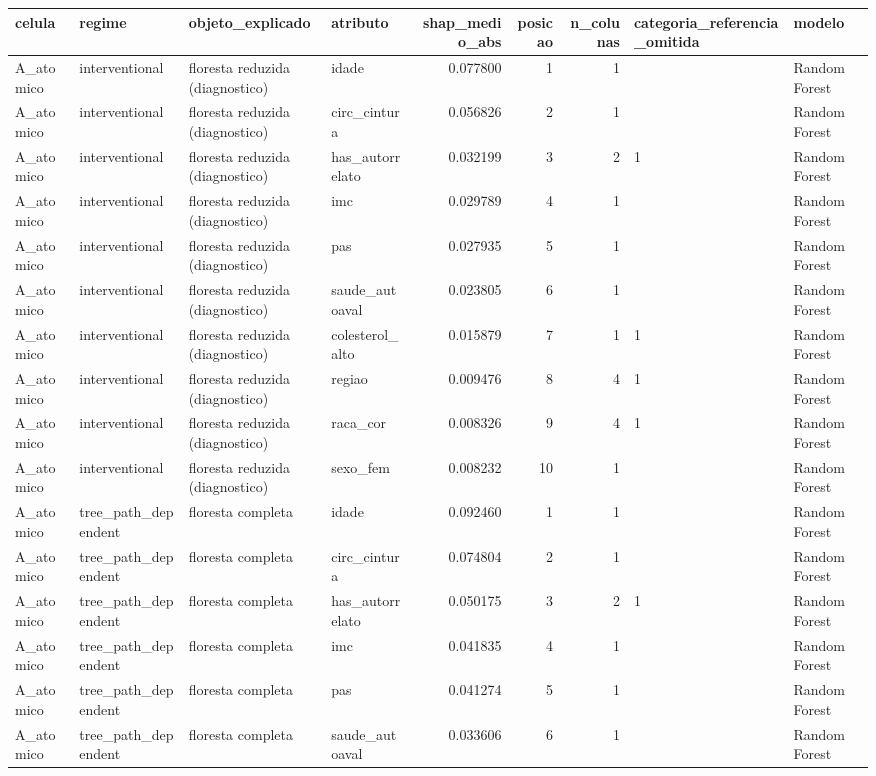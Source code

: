 \begin{tabular}{llllrrrll}
\toprule
celula & regime & objeto_explicado & atributo & shap_medio_abs & posicao & n_colunas & categoria_referencia_omitida & modelo \\
\midrule
A_atomico & interventional & floresta reduzida (diagnostico) & idade & 0.077800 & 1 & 1 &  & Random Forest \\
A_atomico & interventional & floresta reduzida (diagnostico) & circ_cintura & 0.056826 & 2 & 1 &  & Random Forest \\
A_atomico & interventional & floresta reduzida (diagnostico) & has_autorrelato & 0.032199 & 3 & 2 & 1 & Random Forest \\
A_atomico & interventional & floresta reduzida (diagnostico) & imc & 0.029789 & 4 & 1 &  & Random Forest \\
A_atomico & interventional & floresta reduzida (diagnostico) & pas & 0.027935 & 5 & 1 &  & Random Forest \\
A_atomico & interventional & floresta reduzida (diagnostico) & saude_autoaval & 0.023805 & 6 & 1 &  & Random Forest \\
A_atomico & interventional & floresta reduzida (diagnostico) & colesterol_alto & 0.015879 & 7 & 1 & 1 & Random Forest \\
A_atomico & interventional & floresta reduzida (diagnostico) & regiao & 0.009476 & 8 & 4 & 1 & Random Forest \\
A_atomico & interventional & floresta reduzida (diagnostico) & raca_cor & 0.008326 & 9 & 4 & 1 & Random Forest \\
A_atomico & interventional & floresta reduzida (diagnostico) & sexo_fem & 0.008232 & 10 & 1 &  & Random Forest \\
A_atomico & tree_path_dependent & floresta completa & idade & 0.092460 & 1 & 1 &  & Random Forest \\
A_atomico & tree_path_dependent & floresta completa & circ_cintura & 0.074804 & 2 & 1 &  & Random Forest \\
A_atomico & tree_path_dependent & floresta completa & has_autorrelato & 0.050175 & 3 & 2 & 1 & Random Forest \\
A_atomico & tree_path_dependent & floresta completa & imc & 0.041835 & 4 & 1 &  & Random Forest \\
A_atomico & tree_path_dependent & floresta completa & pas & 0.041274 & 5 & 1 &  & Random Forest \\
A_atomico & tree_path_dependent & floresta completa & saude_autoaval & 0.033606 & 6 & 1 &  & Random Forest \\

\end{tabular}
